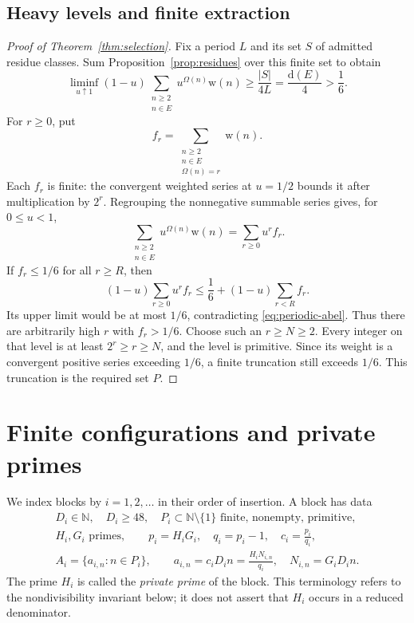 \documentclass[11pt,reqno]{amsart}
\theoremstyle{definition}
\theoremstyle{remark}
\numberwithin{equation}{section}
\newcommand{\N}{\mathbb N}
\newcommand{\Om}{\Omega}
\newcommand{\wt}{\mathrm w}
\newcommand{\dens}{\mathrm d}
\begin{document}
\subsection{Heavy levels and finite extraction}

\begin{proof}[Proof of Theorem~\ref{thm:selection}]
Fix a period $L$ and its set $S$ of admitted residue classes. Sum
Proposition~\ref{prop:residues} over this finite set to obtain
\begin{equation}\label{eq:periodic-abel}
 \liminf_{u\uparrow1}(1-u)
   \sum_{\substack{n\geq2\\n\in E}}u^{\Om(n)}\wt(n)
 \geq\frac{|S|}{4L}=\frac{\dens(E)}4>\frac16.
\end{equation}
For $r\geq0$, put
\[
 f_r=\sum_{\substack{n\geq2\\n\in E\\\Om(n)=r}}\wt(n).
\]
Each $f_r$ is finite: the convergent weighted series at $u=1/2$ bounds
it after multiplication by $2^r$. Regrouping the nonnegative summable
series gives, for $0\leq u<1$,
\begin{equation}\label{eq:layer-decomposition}
 \sum_{\substack{n\geq2\\n\in E}}u^{\Om(n)}\wt(n)
 =\sum_{r\geq0}u^r f_r.
\end{equation}
If $f_r\leq1/6$ for all $r\geq R$, then
\[
 (1-u)\sum_{r\geq0}u^r f_r
 \leq\frac16+(1-u)\sum_{r<R}f_r.
\]
Its upper limit would be at most $1/6$, contradicting
\eqref{eq:periodic-abel}. Thus there are arbitrarily high $r$ with
$f_r>1/6$. Choose such an $r\geq N\geq2$. Every integer on that level
is at least $2^r\geq r\geq N$, and the level is primitive. Since its
weight is a convergent positive series exceeding $1/6$, a finite
truncation still exceeds $1/6$. This truncation is the required set $P$.
\end{proof}

\section{Finite configurations and private primes}
\label{sec:invariants}

We index blocks by $i=1,2,\ldots$ in their order of insertion. A block
has data
\begin{equation}\label{eq:block-data}
 \begin{gathered}
 D_i\in\N,\quad D_i\geq48,\quad
 P_i\subset\N\setminus\{1\}\text{ finite, nonempty, primitive},\\
 H_i,G_i\text{ primes},\qquad
 p_i=H_iG_i,\quad q_i=p_i-1,\quad c_i=\frac{p_i}{q_i},\\
 A_i=\{a_{i,n}:n\in P_i\},\qquad
 a_{i,n}=c_iD_i n=\frac{H_iN_{i,n}}{q_i},\quad
 N_{i,n}=G_iD_i n.
 \end{gathered}
\end{equation}
The prime $H_i$ is called the \emph{private prime} of the block.
This terminology refers to the nondivisibility invariant below; it
does not assert that $H_i$ occurs in a reduced denominator.
\end{document}
